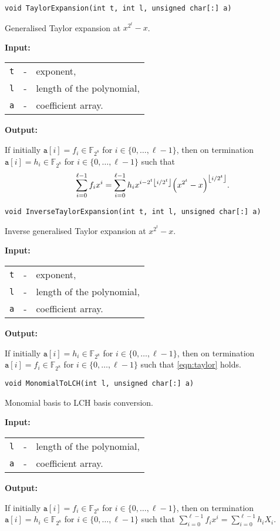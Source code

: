\documentclass{amsart}
\makeatletter
\newcommand{\floor}[1]{\left\lfloor #1\right\rfloor}
\newcommand{\F}{\mathbb{F}}
\newcommand{\Input}{\textbf{Input:}}
\newcommand{\Output}{\textbf{Output:}}
\newcommand{\MtoX}{MonomialToLCH}
\newcommand{\Taylor}{TaylorExpansion}
\let\originalleft\left
\let\originalright\right
\renewcommand{\left}{\mathopen{}\mathclose\bgroup\originalleft}
\renewcommand{\right}{\aftergroup\egroup\originalright}
\newenvironment{inputs}{\Input\par\begin{tabular}{@{}rcl}}{\end{tabular}}
\newenvironment{outputs}{\Output\par}{}
\makeatother
\begin{document}
\texttt{void \Taylor(int t, int l, unsigned char[:]\ a)}

Generalised Taylor expansion at $x^{2^t}-x$.

\begin{inputs}
	\texttt{t} & - & exponent,                 \\
	\texttt{l} & - & length of the polynomial, \\
	\texttt{a} & - & coefficient array.
\end{inputs}

\begin{outputs}
	If initially $\texttt{a}[i]=f_i\in\F_{2^8}$ for $i\in\{0,\dotsc,\ell-1\}$, then
	on termination $\texttt{a}[i]=h_i\in\F_{2^8}$ for $i\in\{0,\dotsc,\ell-1\}$ such
	that
	\begin{equation}\label{eqn:taylor}
		\sum^{\ell-1}_{i=0}f_ix^i
		=
		\sum^{\ell-1}_{i=0}
		h_i
		x^{i-2^t\floor{i/2^t}}
		\left(x^{2^t}-x\right)^{\floor{i/2^t}}.
	\end{equation}
\end{outputs}

\texttt{void InverseTaylorExpansion(int t, int l, unsigned char[:]\ a)}

Inverse generalised Taylor expansion at $x^{2^t}-x$.

\begin{inputs}
	\texttt{t} & - & exponent,                 \\
	\texttt{l} & - & length of the polynomial, \\
	\texttt{a} & - & coefficient array.
\end{inputs}

\begin{outputs}
	If initially $\texttt{a}[i]=h_i\in\F_{2^8}$ for $i\in\{0,\dotsc,\ell-1\}$, then
	on termination $\texttt{a}[i]=f_i\in\F_{2^8}$ for $i\in\{0,\dotsc,\ell-1\}$ such
	that \eqref{eqn:taylor} holds.
\end{outputs}

\texttt{void \MtoX(int l, unsigned char[:]\ a)}

Monomial basis to LCH basis conversion.

\begin{inputs}
	\texttt{l} & - & length of the polynomial, \\
	\texttt{a} & - & coefficient array.
\end{inputs}

\begin{outputs}
	If initially $\texttt{a}[i]=f_i\in\F_{2^8}$ for $i\in\{0,\dotsc,\ell-1\}$, then
	on termination $\texttt{a}[i]=h_i\in\F_{2^8}$ for $i\in\{0,\dotsc,\ell-1\}$ such
	that $\sum^{\ell-1}_{i=0}f_ix^i=\sum^{\ell-1}_{i=0}h_iX_i$.
\end{outputs}
\end{document}
